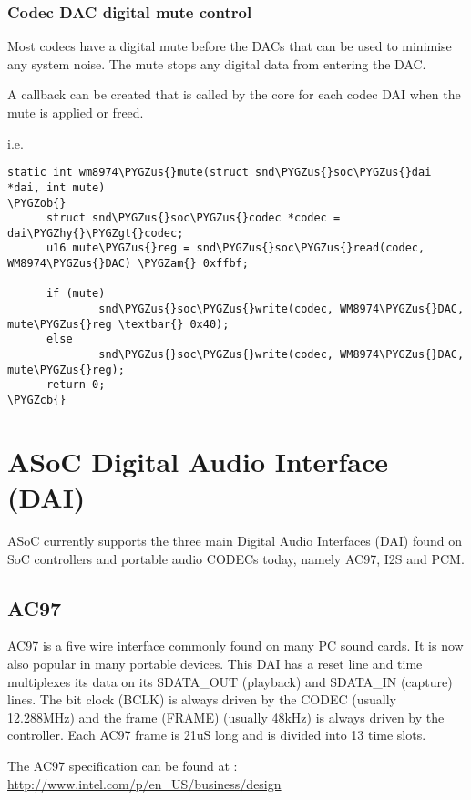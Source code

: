 \documentclass[a4paper,8pt,english]{sphinxmanual}
\def\PYGZus{\char`\_}
\def\PYGZob{\char`\{}
\def\PYGZcb{\char`\}}
\def\PYGZam{\char`\&}
\def\PYGZgt{\char`\>}
\def\PYGZhy{\char`\-}
\begin{document}
\subsubsection{Codec DAC digital mute control}
\label{sound/soc/codec:codec-dac-digital-mute-control}
Most codecs have a digital mute before the DACs that can be used to
minimise any system noise.  The mute stops any digital data from
entering the DAC.

A callback can be created that is called by the core for each codec DAI
when the mute is applied or freed.

i.e.

\begin{Verbatim}[commandchars=\\\{\}]
static int wm8974\PYGZus{}mute(struct snd\PYGZus{}soc\PYGZus{}dai *dai, int mute)
\PYGZob{}
      struct snd\PYGZus{}soc\PYGZus{}codec *codec = dai\PYGZhy{}\PYGZgt{}codec;
      u16 mute\PYGZus{}reg = snd\PYGZus{}soc\PYGZus{}read(codec, WM8974\PYGZus{}DAC) \PYGZam{} 0xffbf;

      if (mute)
              snd\PYGZus{}soc\PYGZus{}write(codec, WM8974\PYGZus{}DAC, mute\PYGZus{}reg \textbar{} 0x40);
      else
              snd\PYGZus{}soc\PYGZus{}write(codec, WM8974\PYGZus{}DAC, mute\PYGZus{}reg);
      return 0;
\PYGZcb{}
\end{Verbatim}


\section{ASoC Digital Audio Interface (DAI)}
\label{sound/soc/dai::doc}\label{sound/soc/dai:asoc-digital-audio-interface-dai}
ASoC currently supports the three main Digital Audio Interfaces (DAI) found on
SoC controllers and portable audio CODECs today, namely AC97, I2S and PCM.


\subsection{AC97}
\label{sound/soc/dai:ac97}
AC97 is a five wire interface commonly found on many PC sound cards. It is
now also popular in many portable devices. This DAI has a reset line and time
multiplexes its data on its SDATA\_OUT (playback) and SDATA\_IN (capture) lines.
The bit clock (BCLK) is always driven by the CODEC (usually 12.288MHz) and the
frame (FRAME) (usually 48kHz) is always driven by the controller. Each AC97
frame is 21uS long and is divided into 13 time slots.

The AC97 specification can be found at :
\href{http://www.intel.com/p/en\_US/business/design}{http://www.intel.com/p/en\_US/business/design}
\end{document}
